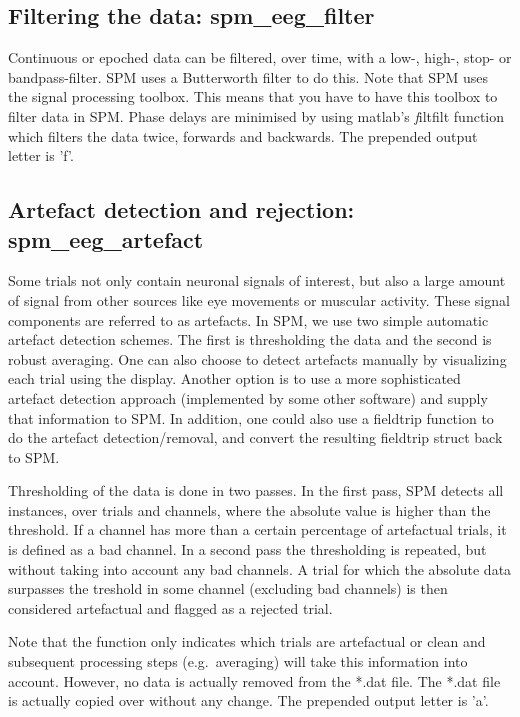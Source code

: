 \subsection{Filtering the data: spm\_eeg\_filter}
Continuous or epoched data can be filtered, over time, with a low-,
high-, stop- or 
bandpass-filter. SPM uses a Butterworth filter to do this. Note that
SPM uses the signal processing toolbox. This means that you have to
have this toolbox to filter data in SPM. Phase delays are minimised by
using matlab's {\textit filtfilt} function which filters the data
twice, forwards and backwards. The prepended output letter is 'f'.

\subsection{Artefact detection and rejection: spm\_eeg\_artefact}
Some trials not only contain neuronal signals of
interest, but also a large amount of signal from other sources like
eye movements or muscular activity. These signal components are
referred to as artefacts. In SPM, we use two simple automatic
artefact detection schemes. The first is thresholding the data and the
second is robust averaging. One can also choose to detect artefacts
manually by visualizing each trial using the display. Another option
is to use a more sophisticated artefact detection approach
(implemented by some other software) and supply that information to
SPM. In addition, one could also use a fieldtrip function to do the
artefact detection/removal, and convert the resulting fieldtrip struct
back to SPM.

Thresholding of the data is done in two passes. In the first pass, SPM
detects all instances, over trials and channels, where the
absolute value is higher than the threshold. If a channel has more
than a certain percentage of artefactual trials, it is defined as a
bad channel. In a second pass the thresholding is repeated, but
without taking into account any bad channels. A trial for which the
absolute data surpasses the treshold in some channel (excluding bad
channels) is then considered artefactual and flagged as a rejected
trial.

Note that the function only indicates which trials are artefactual or
clean and subsequent processing steps (e.g.~averaging) will take this 
information into account. However, no data is actually removed from
the *.dat file. The *.dat file is actually copied over without any
change. The prepended output letter is 'a'.


